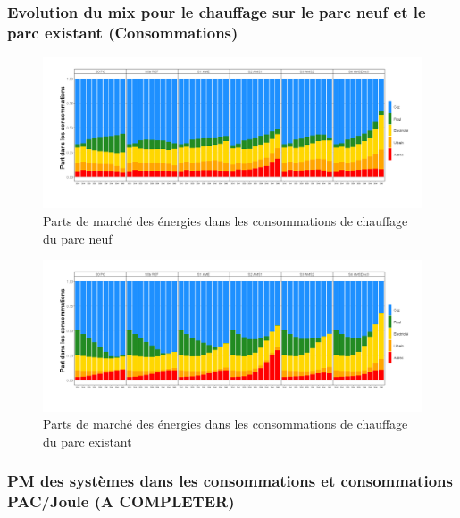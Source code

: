 \documentclass[]{article}
\begin{document}
\subsubsection{Evolution du mix pour le chauffage sur le parc neuf et le
parc existant
(Consommations)}\label{evolution-du-mix-pour-le-chauffage-sur-le-parc-neuf-et-le-parc-existant-consommations}

\begin{figure}
\centering
\includegraphics{Exemple_sortiestertiaire_files/figure-latex/Evol_PM_ener_cahuffage_neuf-1.png}
\caption{Parts de marché des énergies dans les consommations de
chauffage du parc neuf}
\end{figure}

\begin{figure}
\centering
\includegraphics{Exemple_sortiestertiaire_files/figure-latex/Evol_PM_ener_cahuffage_exi-1.png}
\caption{Parts de marché des énergies dans les consommations de
chauffage du parc existant}
\end{figure}

\subsubsection{PM des systèmes dans les consommations et consommations
PAC/Joule (A
COMPLETER)}\label{pm-des-systemes-dans-les-consommations-et-consommations-pacjoule-a-completer}

\clearpage
\pagebreak
\newpage
\end{document}
